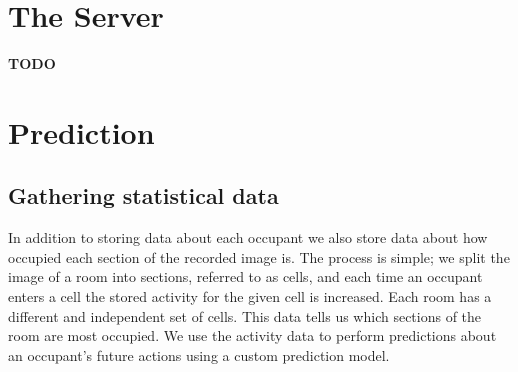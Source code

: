\section{The Server}
{\color[rgb]{1,0,0} \textbf{\large TODO}}

\section{Prediction}

\subsection{Gathering statistical data}
\label{ssub:statisticaldata}
In addition to storing data about each occupant we also store data about how occupied each section of the recorded image is. The process is simple; we split the image of a room into sections, referred to as cells, and each time an occupant enters a cell the stored activity for the given cell is increased. Each room has a different and independent set of cells. This data tells us which sections of the room are most occupied. We use the activity data to perform predictions about an occupant's future actions using a custom prediction model.

